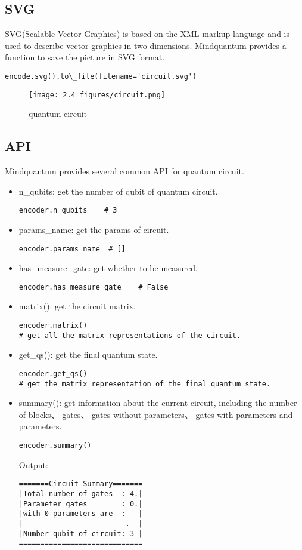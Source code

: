 \subsection{SVG}
SVG(Scalable Vector Graphics) is based on the XML markup language and is used to describe vector graphics in two dimensions. Mindquantum provides a function to save the picture in SVG format.
    \begin{lstlisting}
encode.svg().to\_file(filename='circuit.svg')
    \end{lstlisting}
    \begin{figure}[h]
       \begin{center}
            \texttt{[image: 2.4\_figures/circuit.png]}
        \end{center}
        \caption{quantum circuit}
    \end{figure}
\subsection{API}
Mindquantum provides several common API for quantum circuit.
\begin{itemize}
    \item n\_qubits: get the number of qubit of quantum circuit.
    \begin{lstlisting}
encoder.n_qubits    # 3
    \end{lstlisting}
    \item params\_name: get the params of circuit.
    \begin{lstlisting}
encoder.params_name  # []
    \end{lstlisting}
    \item has\_measure\_gate: get whether to be measured.
    \begin{lstlisting}
encoder.has_measure_gate    # False
    \end{lstlisting}
    \item matrix(): get the circuit matrix.
    \begin{lstlisting}
encoder.matrix() 
# get all the matrix representations of the circuit.
    \end{lstlisting}
    \item get\_qs(): get the final quantum state.
    \begin{lstlisting}
encoder.get_qs()  
# get the matrix representation of the final quantum state.
    \end{lstlisting}
    \item summary(): get information about the current circuit, including the number of blocks、 gates、 gates without parameters、 gates with parameters and parameters.
    \begin{lstlisting}
encoder.summary()   
    \end{lstlisting}
Output:
\begin{lstlisting}
=======Circuit Summary=======
|Total number of gates  : 4.|
|Parameter gates        : 0.|
|with 0 parameters are  :   |
|                        .  |
|Number qubit of circuit: 3 |
=============================  
\end{lstlisting}
\end{itemize}
